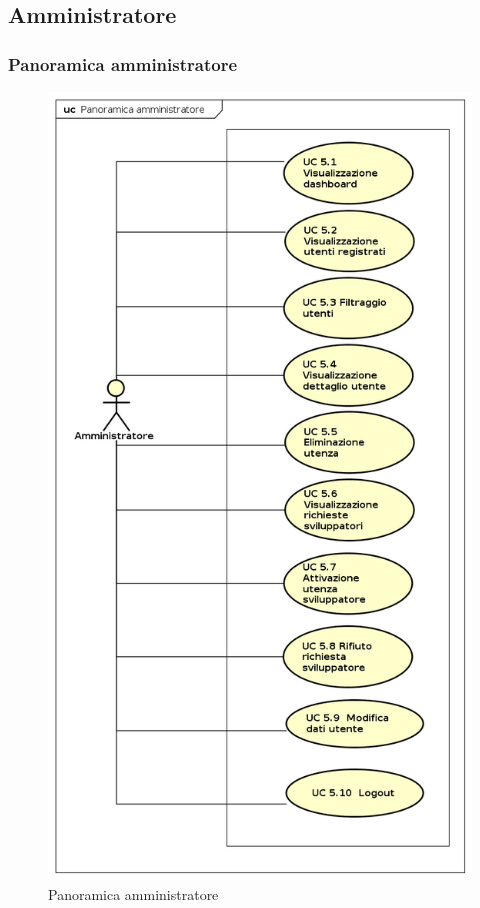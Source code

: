 \subsection{Amministratore}

\subsubsection{Panoramica amministratore}
\begin{figure}[H]
\centering
\includegraphics[width=12cm, keepaspectratio]{img/PanoramicaAmministratore.png} 
\caption{Panoramica amministratore}
\end{figure}


